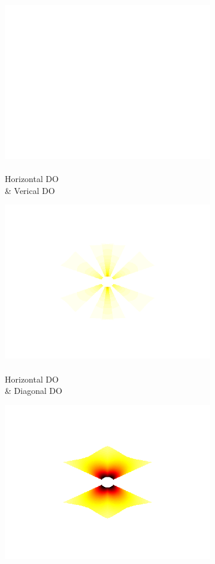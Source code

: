 \documentclass[journal,onecolumn]{IEEEtran}
\begin{document}
\begin{figure}[h]
\begin{subfigure}[b]{0.2\textwidth}
            \includegraphics[width=.85\linewidth]{map-w_blank}
            \caption{\\ Horizontal DO \\ \& Verical DO}
    \end{subfigure}%
    \begin{subfigure}[b]{0.2\textwidth}
            \centering
            \captionsetup{justification=centering}
            \includegraphics[width=.85\linewidth]{map-w_3_2}
            \caption{\\ Horizontal DO \\ \& Diagonal DO}
    \end{subfigure}%
    \begin{subfigure}[b]{0.2\textwidth}
            \centering
            \captionsetup{justification=centering}
            \includegraphics[width=.85\linewidth]{map-w_3_3}

\end{subfigure}
\end{figure}
\end{document}
